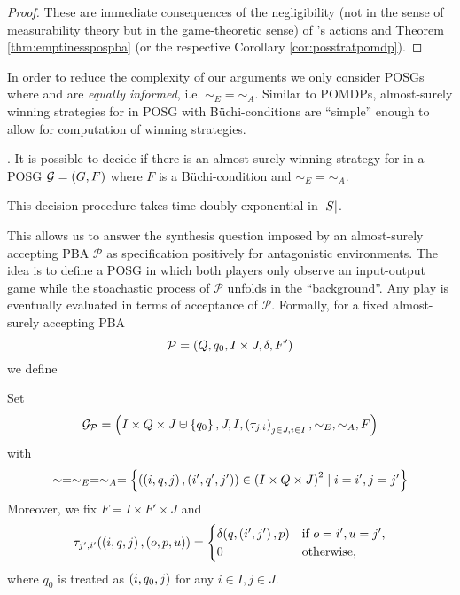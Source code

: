\begin{proof}
  These are immediate consequences of the negligibility (not in the sense of
  measurability theory but in the game-theoretic sense) of \adam{}'s actions
  and Theorem \ref{thm:emptinesspospba} (or the respective Corollary 
  \ref{cor:posstratpomdp}).
\end{proof}
In order to reduce the complexity of our arguments we only consider \acp{POSG}
where \eve{} and \adam{} are \emph{equally informed}, i.e.
$\sim_{E} = \sim_{A}$. Similar to \acp{POMDP}, almost-surely winning strategies
for \eve{} in \ac{POSG} with Büchi-conditions are \enquote{simple} enough to
allow for computation of winning strategies.
\begin{theorem}
  \cite[Theorem 6]{POSG}\cite[Theorem 5.3]{PureStratPOSG}.
  It is possible to decide if there is an almost-surely winning strategy for 
  \eve{} in a \ac{POSG} $\mathcal{G} = \left(G, F\right)$ where $F$ is a 
  Büchi-condition and $\sim_{E} = \sim_{A}$.

  This decision procedure takes time doubly exponential in $\left\vert{S}\right\vert$.
  \label{thm:StratPOSG}
\end{theorem}
This allows us to answer the synthesis question imposed by an almost-surely
accepting \ac{PBA} $\mathcal{P}$ as specification positively for antagonistic
environments. The idea is to define a \ac{POSG} in which both players only
observe an input-output game while the stoachastic process of $\mathcal{P}$
unfolds in the \enquote{background}. Any play is eventually evaluated in terms
of acceptance of $\mathcal{P}$. Formally, for a fixed almost-surely accepting
\ac{PBA}
\begin{equation*}
  \mathcal{P} = \left(Q, q_{0}, I\times J, \delta, F'\right)
\end{equation*}
we define
\begin{definition}
  Set
  \begin{equation*}
    \mathcal{G}_{\mathcal{P}} = \left(I\times Q\times J\uplus\left\{q_{0}\right\}, J,
      I, \left(\tau_{j,i}\right)_{j\in J,i\in I}, \sim_{E}, \sim_{A}, F\right)
  \end{equation*}
  with
  \begin{equation*}
    \sim = \sim_{E} = \sim_{A} = \left\{\left(\left(i, q, j\right), 
    \left(i', q', j'\right)\right)\in \left(I\times Q\times J\right)^{2}\mid i = i', j = j'\right\}
  \end{equation*}
  Moreover, we fix $F = I\times F'\times J$ and
  \begin{equation*}
    \tau_{j',i'}(\left(i, q, j\right), \left(o, p, u\right)) = \begin{cases}
      \delta(q, \left(i', j'\right), p)&\text{if }o = i', u = j',\\
      0&\text{otherwise},
    \end{cases}
  \end{equation*}
  where $q_{0}$ is treated as $\left(i, q_{0}, j\right)$ for any $i\in I, j\in J$.
\end{definition}
